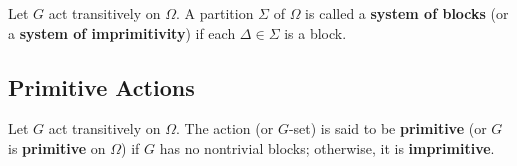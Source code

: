 \begin{definition}
	Let $G$ act transitively on $\Omega$. A partition $\Sigma$ of $\Omega$ is called a \textbf{system of blocks} (or a \textbf{system of imprimitivity}) if each $\Delta\in \Sigma$ is a block.
\end{definition}

\subsection{Primitive Actions}

\begin{definition}
	Let $G$ act transitively on $\Omega$. The action (or $G$-set) is said to be \textbf{primitive} (or $G$ is \textbf{primitive} on $\Omega$) if $G$ has no nontrivial blocks; otherwise, it is \textbf{imprimitive}.
\end{definition}

